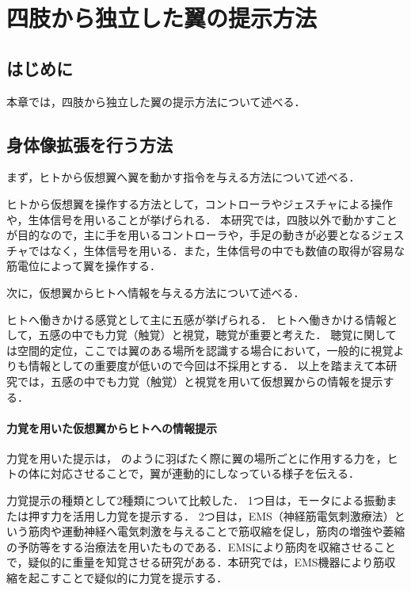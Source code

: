 \chapter[四肢から独立した翼の提示方法]%
        {四肢から独立した翼の提示方法}

\section{はじめに}
    本章では，四肢から独立した翼の提示方法について述べる．



\section{身体像拡張を行う方法}
    まず，ヒトから仮想翼へ翼を動かす指令を与える方法について述べる．

    ヒトから仮想翼を操作する方法として，コントローラやジェスチャによる操作や，生体信号を用いることが挙げられる．
    本研究では，四肢以外で動かすことが目的なので，主に手を用いるコントローラや，手足の動きが必要となるジェスチャではなく，生体信号を用いる．また，生体信号の中でも数値の取得が容易な筋電位によって翼を操作する．



    次に，仮想翼からヒトへ情報を与える方法について述べる．

    ヒトへ働きかける感覚として主に五感が挙げられる．
    ヒトへ働きかける情報として，五感の中でも力覚（触覚）と視覚，聴覚が重要と考えた．
    聴覚に関しては空間的定位，ここでは翼のある場所を認識する場合において，一般的に視覚よりも情報としての重要度が低い\cite{岡嶋克典20182}ので今回は不採用とする．
    以上を踏まえて本研究では，五感の中でも力覚（触覚）と視覚を用いて仮想翼からの情報を提示する．

    \subsubsection{力覚を用いた仮想翼からヒトへの情報提示}

        力覚を用いた提示は，
        のように羽ばたく際に翼の場所ごとに作用する力を，ヒトの体に対応させることで，翼が連動的にしなっている様子を伝える．

        力覚提示の種類として2種類について比較した．
        1つ目は，モータによる振動または押す力を活用し力覚を提示する．
        2つ目は，EMS（神経筋電気刺激療法）という筋肉や運動神経へ電気刺激を与えることで筋収縮を促し，筋肉の増強や萎縮の予防等をする治療法を用いたものである．EMSにより筋肉を収縮させることで，疑似的に重量を知覚させる研究がある\cite{小川剛史2017電気的筋肉刺激が重量知覚に及ぼす影響の分析}．本研究では，EMS機器により筋収縮を起こすことで疑似的に力覚を提示する．
    
